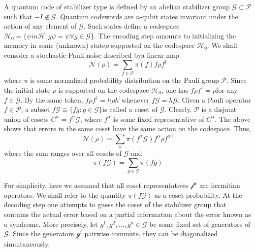 A quantum code of stabilizer type is defined by an abelian stabilizer group \(\mathcal{G} \subset \mathcal{P}\) such that \(-I \notin \mathcal{G}\). Quantum codewords are \(n\)-qubit states invariant under the action of any element of \(\mathcal{G}\). Such states define a codespace \(\mathcal{H}_0 = \{ \psi in  \mathcal{H}: g \psi = \psi \forall g \in \mathcal{G}\}\). The encoding step amounts to initializing the memory in some (unknown) state\(\rho\) supported on the codespace \(\mathcal{H}_0\). We shall consider a stochastic Pauli noise described bya linear map
\begin{equation*}
    \mathcal{N}(\rho)  = \sum_{f \in \mathcal{P}} \pi (f) f \rho f^{\dag}
\end{equation*}
where \(\pi\) is some normalized probability distribution on the Pauli group \(\mathcal{P}\).
Since the initial state \(\rho\) is supported on the codespace \(\mathcal{H}_0\), one has \(f \rho f^{\dag} = \rho\)for any \(f \in \mathcal{G}\). By the same token, \(f \rho f^{\dag} = h \rho h^{\dag}\)whenever \(f\mathcal{G} = h\mathcal{G}\). Given a Pauli operator \(f \in \mathcal{P}\), a subset \(f\mathcal{G}\equiv \{fg: g \in \mathcal{G}\}\)is called a coset of \(\mathcal{G}\). Clearly, \(\mathcal{P}\) is a disjoint union of cosets \(C^{\alpha} = f^{\alpha} \mathcal{G}\), where \(f^{\alpha}\) is some fixed representative of \(C^{\alpha}\). The above shows that errors in the same coset have the same action on the codespace. Thus,
\begin{equation*}
    \mathcal{N}(\rho)  = \sum_{\alpha} \pi (f^{\alpha}\mathcal{G}) f^{\alpha} \rho {f^{\alpha}}^{\dag}
\end{equation*}
where the sum ranges over all cosets of \(\mathcal{G}\) and
\begin{equation*}
    \pi(f\mathcal{G}) = \sum_{g \in \mathcal{G}} \pi(fg)
\end{equation*}

For simplicity, here we assumed that all coset representatives \(\mathcal{f^{\alpha}}\) are hermitian operators. We shall refer to the quantity \(\pi(f \mathcal{G})\) as a coset probability. At the decoding step one attempts to guess the coset of the stabilizer group that contains the actual error based on a partial information about the error known as a syndrome. More precisely, let \(g^1,g^2,\dots,g^n \in \mathcal{G}\) be some fixed set of generators of \(\mathcal{G}\). Since the generators \(\mathcal{g}^i\) pairwise commute, they can be diagonalized simultaneously.


